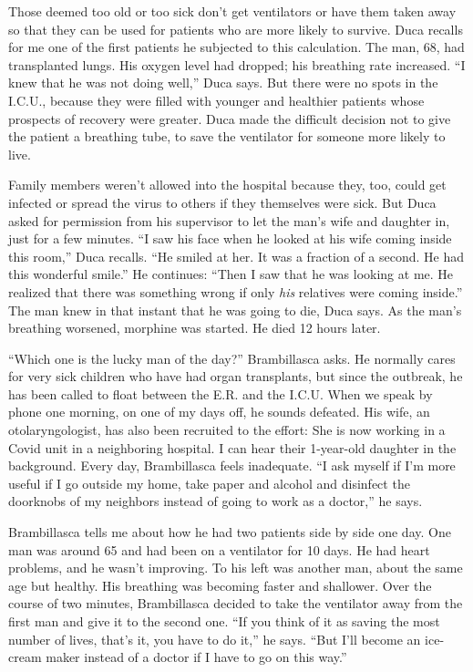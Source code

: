 Those deemed too old or too sick don't get ventilators or have them
taken away so that they can be used for patients who are more likely to
survive. Duca recalls for me one of the first patients he subjected to
this calculation. The man, 68, had transplanted lungs. His oxygen level
had dropped; his breathing rate increased. ``I knew that he was not
doing well,'' Duca says. But there were no spots in the I.C.U., because
they were filled with younger and healthier patients whose prospects of
recovery were greater. Duca made the difficult decision not to give the
patient a breathing tube, to save the ventilator for someone more likely
to live.

Family members weren't allowed into the hospital because they, too,
could get infected or spread the virus to others if they themselves were
sick. But Duca asked for permission from his supervisor to let the man's
wife and daughter in, just for a few minutes. ``I saw his face when he
looked at his wife coming inside this room,'' Duca recalls. ``He smiled
at her. It was a fraction of a second. He had this wonderful smile.'' He
continues: ``Then I saw that he was looking at me. He realized that
there was something wrong if only \emph{his} relatives were coming
inside.'' The man knew in that instant that he was going to die, Duca
says. As the man's breathing worsened, morphine was started. He died 12
hours later.

``Which one is the lucky man of the day?'' Brambillasca asks. He
normally cares for very sick children who have had organ transplants,
but since the outbreak, he has been called to float between the E.R. and
the I.C.U. When we speak by phone one morning, on one of my days off, he
sounds defeated. His wife, an otolaryngologist, has also been recruited
to the effort: She is now working in a Covid unit in a neighboring
hospital. I can hear their 1-year-old daughter in the background. Every
day, Brambillasca feels inadequate. ``I ask myself if I'm more useful if
I go outside my home, take paper and alcohol and disinfect the doorknobs
of my neighbors instead of going to work as a doctor,'' he says.

Brambillasca tells me about how he had two patients side by side one
day. One man was around 65 and had been on a ventilator for 10 days. He
had heart problems, and he wasn't improving. To his left was another
man, about the same age but healthy. His breathing was becoming faster
and shallower. Over the course of two minutes, Brambillasca decided to
take the ventilator away from the first man and give it to the second
one. ``If you think of it as saving the most number of lives, that's it,
you have to do it,'' he says. ``But I'll become an ice-cream maker
instead of a doctor if I have to go on this way.''

